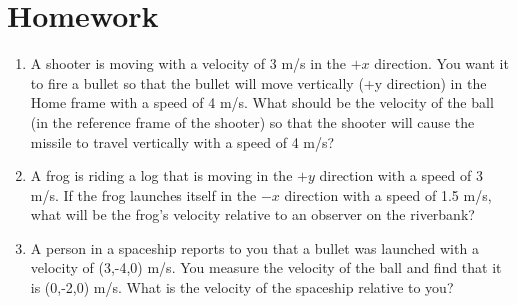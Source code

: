 

\pagebreak

\section{Homework}

\begin{enumerate}
	\item	A shooter is moving with a velocity of 3 m/s in the $+x$ direction. You want it to fire a bullet so that the bullet will move vertically (+y direction) in the Home frame with a speed of 4 m/s. What should be the velocity of the ball (in the reference frame of the shooter) so that the shooter will cause the missile to travel vertically with a speed of 4 m/s?
	
	\item A frog is riding a log that is moving in the $+y$ direction with a speed of 3 m/s. If the frog launches itself in the $-x$ direction with a speed of 1.5 m/s, what will be the frog's velocity relative to an observer on the riverbank?
	
	\item A person in a spaceship reports to you that a bullet was launched with a velocity of (3,-4,0) m/s. You measure the velocity of the ball and find that it is (0,-2,0) m/s. What is the velocity of the spaceship relative to you?

\end{enumerate}
